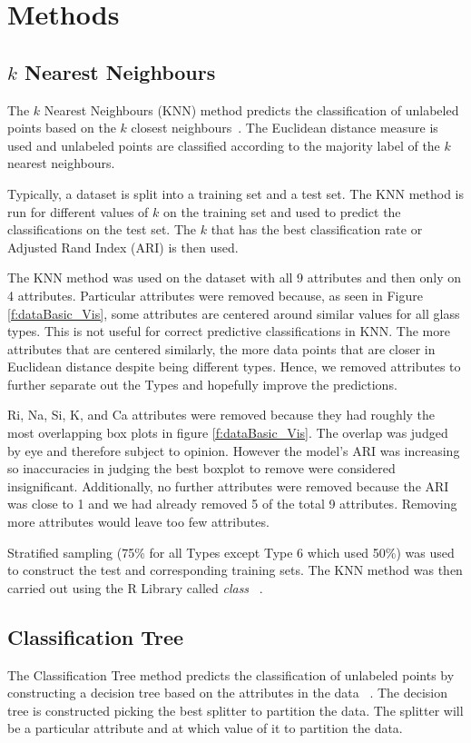 \documentclass[12pt]{article}
\begin{document}
\section{Methods}
\subsection{$ k $ Nearest Neighbours}
The $ k $ Nearest Neighbours (KNN) method predicts the classification of unlabeled points based on the $ k $ closest neighbours~\cite{Lecture}. The Euclidean distance measure is used and unlabeled points are classified according to the majority label of the $ k $ nearest neighbours. 

Typically, a dataset is split into a training set and a test set. 
The KNN method is run for different values of $ k $ on the training set and used to predict the classifications on the test set. 
The $ k $ that has the best classification rate or Adjusted Rand Index (ARI) is then used. 

The KNN method was used on the dataset with all 9 attributes and then only on 4 attributes. Particular attributes were removed because, as seen in Figure \ref{f:dataBasic_Vis}, some attributes are centered around similar values for all glass types. This is not useful for correct predictive classifications in KNN. The more attributes that are centered similarly, the more data points that are closer in Euclidean distance despite being different types. Hence, we removed attributes to further separate out the Types and hopefully improve the predictions. 

Ri, Na, Si, K, and Ca attributes were removed because they had roughly the most overlapping box plots in figure \ref{f:dataBasic_Vis}. The overlap was judged by eye and therefore subject to opinion. However the model's ARI was increasing so inaccuracies in judging the best boxplot to remove were considered insignificant. Additionally, no further attributes were removed because the ARI was close to 1 and we had already removed 5 of the total 9 attributes. Removing more attributes would leave too few attributes. 

Stratified sampling (75\% for all Types except Type 6 which used 50\%) was used to construct the test and corresponding training sets. The KNN method was then carried out using the R Library called \textit{class} ~\cite{R_KNN}. 

\subsection{Classification Tree}
The Classification Tree method predicts the classification of unlabeled points by constructing a decision tree based on the attributes in the data ~\cite{Lecture}. The decision tree is constructed picking the best splitter to partition the data. The splitter will be a particular attribute and at which value of it to partition the data.
\end{document}
